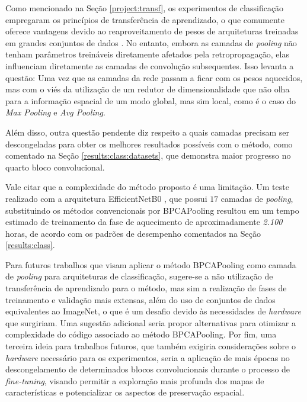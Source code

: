 Como mencionado na Seção \ref{project:transf}, os experimentos de classificação empregaram os princípios de transferência de aprendizado, o que comumente oferece vantagens devido ao reaproveitamento de pesos de arquiteturas treinadas em grandes conjuntos de dados \citep{Pan2010}. No entanto, embora as camadas de \textit{pooling} não tenham parâmetros treináveis diretamente afetados pela retropropagação, elas influenciam diretamente as camadas de convolução subsequentes. Isso levanta a questão:  Uma vez que as camadas da rede passam a ficar com os pesos aquecidos, mas com o viés da utilização de um redutor de dimensionalidade que não olha para a informação espacial de um modo global, mas sim local, como é o caso do \textit{Max Pooling} e \textit{Avg Pooling}.

Além disso, outra questão pendente diz respeito a quais camadas precisam ser descongeladas para obter os melhores resultados possíveis com o método, como comentado na Seção \ref{results:class:datasets}, que demonstra maior progresso no quarto bloco convolucional.

Vale citar que a complexidade do método proposto é uma limitação. Um teste realizado com a arquitetura EfficientNetB0 \citep{Tan2019Efficientnet:Networks}, que possui $17$ camadas de \textit{pooling}, substituindo os métodos convencionais por BPCAPooling resultou em um tempo estimado de treinamento da fase de aquecimento de aproximadamente \textit{2.100} horas, de acordo com os padrões de desempenho comentados na Seção \ref{results:class}.

Para futuros trabalhos que visam aplicar o método BPCAPooling como camada de \textit{pooling} para arquiteturas de classificação, sugere-se a não utilização de transferência de aprendizado para o método, mas sim a realização de fases de treinamento e validação mais extensas, além do uso de conjuntos de dados equivalentes ao ImageNet, o que é um desafio devido às necessidades de \textit{hardware} que surgiriam. Uma sugestão adicional seria propor alternativas para otimizar a complexidade do código associado ao método BPCAPooling. Por fim, uma terceira ideia para trabalhos futuros, que também exigiria considerações sobre o \textit{hardware} necessário para os experimentos, seria a aplicação de mais épocas no descongelamento de determinados blocos convolucionais durante o processo de \textit{fine-tuning}, visando permitir a exploração mais profunda dos mapas de características e potencializar os aspectos de preservação espacial.


